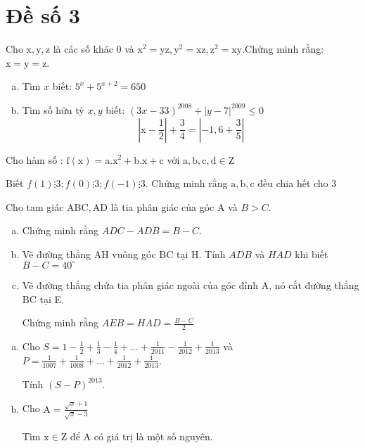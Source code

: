 \onehalfspacing
\section{Đề số 3}

\begin{bt} 
    Cho $\mathrm{x}, \mathrm{y}, \mathrm{z}$ là các số khác 0 và $\mathrm{x}^2=\mathrm{yz}, \mathrm{y}^2=\mathrm{xz}, \mathrm{z}^2=\mathrm{xy}$.\linebreak[2]
    Chứng minh rằng: $\mathrm{x}=\mathrm{y}=\mathrm{z}$.
\loigiai{} 
\end{bt}

\begin{bt}
    \hfill
    \begin{enumerate}[a.]
        \item Tìm $x$ biết: $5^x+5^{x+2}=650$
        \item Tìm số hữu tỷ $x, y$ biết: $(3 x-33)^{2008}+|y-7|^{2009} \leq 0$
    $$
    \left|\mathrm{x}-\frac{1}{2}\right|+\frac{3}{4}=\left|-1,6+\frac{3}{5}\right|
    $$
    \end{enumerate}
\loigiai{} 
\end{bt}

\begin{bt}
    Cho hàm số : $\mathrm{f}(\mathrm{x})=\mathrm{a} .\mathrm{x}^2+\mathrm{b} . \mathrm{x}+\mathrm{c}$ với $\mathrm{a}, \mathrm{b}, \mathrm{c}, \mathrm{d} \in \mathrm{Z}$

    Biết $f(1) \vdots 3 ; f(0) \vdots 3 ; f(-1) \vdots 3$. Chứng minh rằng $\mathrm{a}, \mathrm{b}, \mathrm{c}$ đều chia hết cho 3
\loigiai{} 
\end{bt}

\begin{bt}
    Cho tam giác $\mathrm{ABC}, \mathrm{AD}$ là tia phân giác của góc $\mathrm{A}$ và $B>C$.
    \begin{enumerate}[a.]
    \item Chứng minh rằng $A D C-A D B=B-C$.
    \item Vẽ đường thẳng $\mathrm{AH}$ vuông góc $\mathrm{BC}$ tại $\mathrm{H}$. Tính $A D B$ và $H A D$ khi biết $B-C=40^{\circ}$
    \item Vẽ đường thẳng chứa tia phân giác ngoài của góc đỉnh $\mathrm{A}$, nó cắt đường thẳng $\mathrm{BC}$
    tại E. 
    
    Chứng minh rằng $A E B=H A D=\frac{B-C}{2}$
    \end{enumerate}
\loigiai{}
\end{bt}

\begin{bt}
    \hfill
    \begin{enumerate}[a.]
        \item  Cho $S=1-\frac{1}{2}+\frac{1}{3}-\frac{1}{4}+\ldots+\frac{1}{2011}-\frac{1}{2012}+\frac{1}{2013}$ và $P=\frac{1}{1007}+\frac{1}{1008}+\ldots+\frac{1}{2012}+\frac{1}{2013}$.
        
        Tính $(S-P)^{2013}$.
        \item Cho $\mathrm{A}=\frac{\sqrt{x}+1}{\sqrt{x}-3}$
        
        Tìm $\mathrm{x} \in \mathrm{Z}$ để $\mathrm{A}$ có giá trị là một số nguyên.
    \end{enumerate}
\loigiai{}
\end{bt}